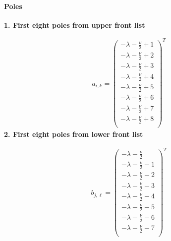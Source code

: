 \documentclass[11pt]{article}
\begin{document}
\paragraph{Poles}

\noindent\textbf{1. First eight poles from upper front list}

\begin{align*}
  a_{i,k} = 
  \left(
\begin{array}{c}
 -\lambda -\frac{\nu }{2}+1 \\
 -\lambda -\frac{\nu }{2}+2 \\
 -\lambda -\frac{\nu }{2}+3 \\
 -\lambda -\frac{\nu }{2}+4 \\
 -\lambda -\frac{\nu }{2}+5 \\
 -\lambda -\frac{\nu }{2}+6 \\
 -\lambda -\frac{\nu }{2}+7 \\
 -\lambda -\frac{\nu }{2}+8 \\
\end{array}
\right)^T 
\end{align*}
\noindent\textbf{2. First eight poles from lower front list}

\begin{align*}
  b_{j,\ell} = 
  \left(
\begin{array}{c}
 -\lambda -\frac{\nu }{2} \\
 -\lambda -\frac{\nu }{2}-1 \\
 -\lambda -\frac{\nu }{2}-2 \\
 -\lambda -\frac{\nu }{2}-3 \\
 -\lambda -\frac{\nu }{2}-4 \\
 -\lambda -\frac{\nu }{2}-5 \\
 -\lambda -\frac{\nu }{2}-6 \\
 -\lambda -\frac{\nu }{2}-7 \\
\end{array}
\right)^T 
\end{align*}

\printbibliography[title={References}]
\end{document}
